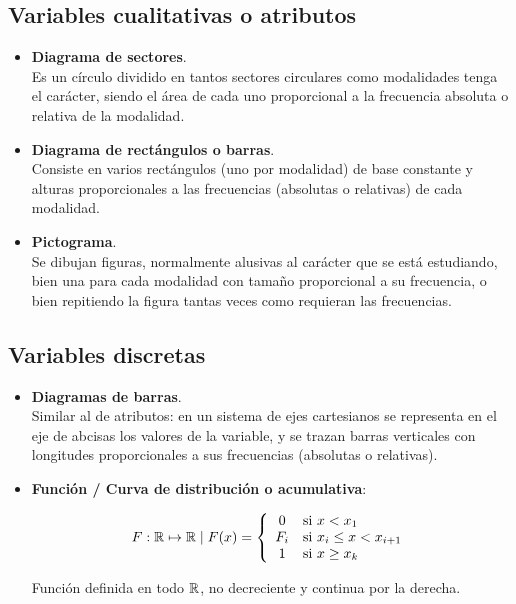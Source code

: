 \subsection{Variables cualitativas o atributos}
\begin{itemize}
    \item \textbf{Diagrama de sectores}.\\
    Es un círculo dividido en tantos sectores circulares como modalidades tenga el carácter, siendo el área de cada uno proporcional a la frecuencia absoluta o relativa de la modalidad.
    
    \item \textbf{Diagrama de rectángulos o barras}.\\
    Consiste en varios rectángulos (uno por modalidad) de base constante y alturas proporcionales a las frecuencias (absolutas o relativas) de cada modalidad.
    
    \item \textbf{Pictograma}.\\
    Se dibujan figuras, normalmente alusivas al carácter que se está estudiando, bien una para cada modalidad con tamaño proporcional a su frecuencia, o bien repitiendo la figura tantas veces como requieran las frecuencias.
\end{itemize}

\subsection{Variables discretas}
\begin{itemize}
    \item \textbf{Diagramas de barras}.\\
    Similar al de atributos: en un sistema de ejes cartesianos se representa en el eje de abcisas los valores de la variable, y se trazan barras verticales con longitudes proporcionales a sus frecuencias (absolutas o relativas).
    
    \item \textbf{Función / Curva de distribución o acumulativa}:

          $$F: \mathbb R \mapsto \mathbb R \mid F(x) = \left\{
              \begin{array}{cl}
                  0   & \mbox{si } x < x_1              \\
                  F_i & \mbox{si } x_i \leq x < x_{i+1} \\
                  1   & \mbox{si } x \geq x_k
              \end{array}\right.
          $$

          Función definida en todo $\mathbb R$, no decreciente y continua por la derecha.

\end{itemize}

